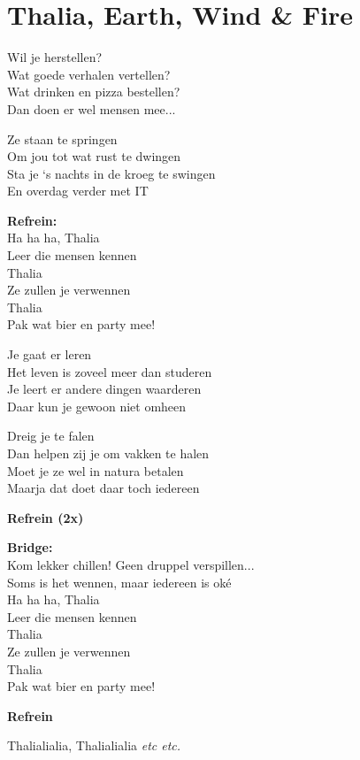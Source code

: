 \section{Thalia, Earth, Wind \& Fire}

Wil je herstellen?\\
Wat goede verhalen vertellen?\\
Wat drinken en pizza bestellen?\\
Dan doen er wel mensen mee...

Ze staan te springen\\
Om jou tot wat rust te dwingen\\
Sta je ‘s nachts in de kroeg te swingen\\
En overdag verder met IT

\textbf{Refrein:}\\
Ha ha ha, Thalia\\
Leer die mensen kennen\\
Thalia\\
Ze zullen je verwennen\\
Thalia\\
Pak wat bier en party mee!

Je gaat er leren\\
Het leven is zoveel meer dan studeren\\
Je leert er andere dingen waarderen\\
Daar kun je gewoon niet omheen

Dreig je te falen\\
Dan helpen zij je om vakken te halen\\
Moet je ze wel in natura betalen\\
Maarja dat doet daar toch iedereen

\textbf{Refrein (2x)}

\textbf{Bridge:}\\
Kom lekker chillen! Geen druppel verspillen...\\
Soms is het wennen, maar iedereen is oké\\
Ha ha ha, Thalia\\
Leer die mensen kennen\\
Thalia\\
Ze zullen je verwennen\\
Thalia\\
Pak wat bier en party mee!

\textbf{Refrein}

Thalialialia, Thalialialia \textit{etc etc.}